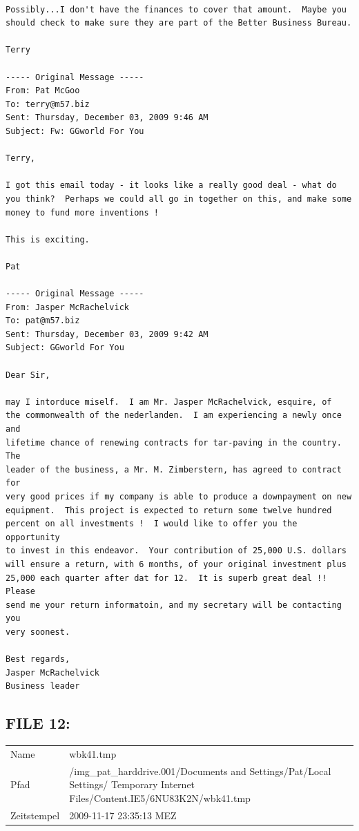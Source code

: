 \begin{lstlisting}

Possibly...I don't have the finances to cover that amount.  Maybe you 
should check to make sure they are part of the Better Business Bureau. 

Terry

----- Original Message -----
From: Pat McGoo
To: terry@m57.biz
Sent: Thursday, December 03, 2009 9:46 AM
Subject: Fw: GGworld For You

Terry,

I got this email today - it looks like a really good deal - what do
you think?  Perhaps we could all go in together on this, and make some
money to fund more inventions !

This is exciting.

Pat

----- Original Message -----
From: Jasper McRachelvick
To: pat@m57.biz
Sent: Thursday, December 03, 2009 9:42 AM
Subject: GGworld For You

Dear Sir,

may I intorduce miself.  I am Mr. Jasper McRachelvick, esquire, of
the commonwealth of the nederlanden.  I am experiencing a newly once and
lifetime chance of renewing contracts for tar-paving in the country.  The
leader of the business, a Mr. M. Zimberstern, has agreed to contract for
very good prices if my company is able to produce a downpayment on new
equipment.  This project is expected to return some twelve hundred
percent on all investments !  I would like to offer you the opportunity
to invest in this endeavor.  Your contribution of 25,000 U.S. dollars
will ensure a return, with 6 months, of your original investment plus
25,000 each quarter after dat for 12.  It is superb great deal !!  Please
send me your return informatoin, and my secretary will be contacting you
very soonest.

Best regards,
Jasper McRachelvick
Business leader
\end{lstlisting}

\subsection{FILE 12:}
\label{sec:pat_emails_12}	

\begin{table}[htb]
	\begin{tabular}{p{2cm} p{13.5cm}}
		Name & wbk41.tmp\\
		Pfad & /img_pat_harddrive.001/Documents and Settings/Pat/Local Settings/ Temporary Internet Files/Content.IE5/6NU83K2N/wbk41.tmp\\
		Zeitstempel & 2009-11-17 23:35:13 MEZ
	\end{tabular}
\end{table}	

